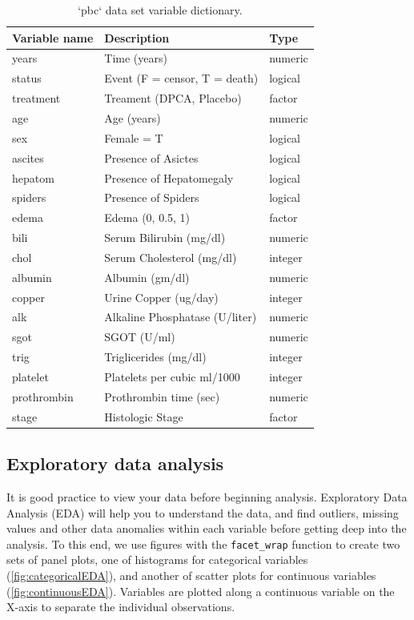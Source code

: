 \documentclass[article]{jss}
\begin{document}
\begin{Schunk}
\begin{table}

\caption{\label{tab:dta-table}`pbc` data set variable dictionary.\label{T:dataLabs}}
\centering
\begin{tabular}[t]{l|l|l}
\hline
Variable name & Description & Type\\
\hline
years & Time (years) & numeric\\
\hline
status & Event (F = censor, T = death) & logical\\
\hline
treatment & Treament (DPCA, Placebo) & factor\\
\hline
age & Age (years) & numeric\\
\hline
sex & Female = T & logical\\
\hline
ascites & Presence of Asictes & logical\\
\hline
hepatom & Presence of Hepatomegaly & logical\\
\hline
spiders & Presence of Spiders & logical\\
\hline
edema & Edema (0, 0.5, 1) & factor\\
\hline
bili & Serum Bilirubin (mg/dl) & numeric\\
\hline
chol & Serum Cholesterol (mg/dl) & integer\\
\hline
albumin & Albumin (gm/dl) & numeric\\
\hline
copper & Urine Copper (ug/day) & integer\\
\hline
alk & Alkaline Phosphatase (U/liter) & numeric\\
\hline
sgot & SGOT (U/ml) & numeric\\
\hline
trig & Triglicerides (mg/dl) & integer\\
\hline
platelet & Platelets per cubic ml/1000 & integer\\
\hline
prothrombin & Prothrombin time (sec) & numeric\\
\hline
stage & Histologic Stage & factor\\
\hline
\end{tabular}
\end{table}

\end{Schunk}

\subsection{Exploratory data analysis}\label{exploratory-data-analysis}

It is good practice to view your data before beginning analysis.
Exploratory Data Analysis (EDA) \citep{Tukey:1977} will help you to
understand the data, and find outliers, missing values and other data
anomalies within each variable before getting deep into the analysis. To
this end, we use  figures with the \texttt{facet\_wrap}
function to create two sets of panel plots, one of histograms for
categorical variables (\autoref{fig:categoricalEDA}), and another of
scatter plots for continuous variables (\autoref{fig:continuousEDA}).
Variables are plotted along a continuous variable on the X-axis to
separate the individual observations.
\end{document}
